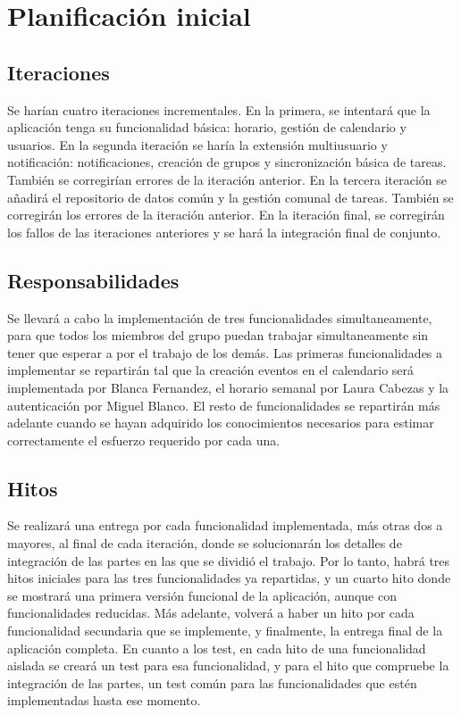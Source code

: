 \documentclass[a4paper,openright,12pt]{article}
\begin{document}
\section{Planificación inicial}

\subsection{Iteraciones}
Se harían cuatro iteraciones incrementales. En la primera, se intentará que la aplicación tenga su funcionalidad básica: horario, gestión de calendario y usuarios.
En la segunda iteración se haría la extensión multiusuario y notificación: notificaciones, creación de grupos y sincronización básica de tareas. También se corregirían errores de la iteración anterior.
En la tercera iteración se añadirá el repositorio de datos común y la gestión comunal de tareas. También se corregirán los errores de la iteración anterior.
En la iteración final, se corregirán los fallos de las iteraciones anteriores y se hará la integración final de conjunto.

\subsection{Responsabilidades}
Se llevará a cabo la implementación de tres funcionalidades simultaneamente, para que todos los miembros del grupo puedan trabajar simultaneamente sin tener que esperar a por el trabajo de los demás. Las primeras funcionalidades a implementar se repartirán tal que 
la creación eventos en el calendario será implementada por Blanca Fernandez, el horario semanal por Laura Cabezas y la autenticación por Miguel Blanco. El resto de funcionalidades se repartirán más adelante cuando se hayan adquirido los conocimientos necesarios para estimar correctamente el esfuerzo requerido por cada una.
\subsection{Hitos}
Se realizará una entrega por cada funcionalidad implementada, más otras dos a mayores, al final de cada iteración, donde se solucionarán los detalles de integración de las partes en las que se dividió el trabajo. Por lo tanto, habrá tres hitos iniciales para las tres funcionalidades ya repartidas, y un cuarto hito donde se mostrará una primera versión funcional de la aplicación, aunque con funcionalidades reducidas. Más adelante, volverá a haber un hito por cada funcionalidad secundaria que se implemente, y finalmente, la entrega final de la aplicación completa. 
En cuanto a los test, en cada hito de una funcionalidad aislada se creará un test para esa funcionalidad, y para el hito que compruebe la integración de las partes, un test común para las funcionalidades que estén implementadas hasta ese momento.
\end{document}
